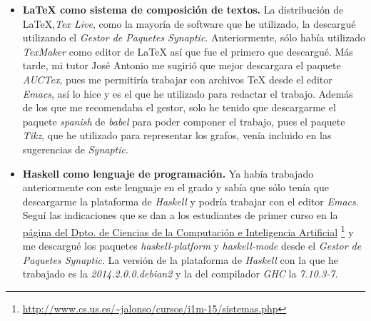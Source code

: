 \begin{itemize}
  \item \textbf{\LaTeX{} como sistema de composición de textos.} La distribución
    de \LaTeX{},\textit{Tex Live}, como la mayoría de software que he utilizado,
    la descargué utilizando el \textit{Gestor de Paquetes Synaptic}.
    Anteriormente, sólo había utilizado  \textit{TexMaker} como editor de 
    \LaTeX{} así que fue el primero que descargué. Más tarde, mi tutor José 
    Antonio me sugirió que mejor descargara el paquete \textit{AUCTex}, pues me
    permitiría trabajar con archivos \TeX{} desde el editor \textit{Emacs}, así
    lo hice y es el que he utilizado para redactar el trabajo. Además de los que
    me recomendaba el gestor, solo he tenido que descargarme el paquete 
    \textit{spanish} de \textit{babel} para poder componer el trabajo, pues
    el paquete \textit{Tikz}, que he utilizado para representar los grafos,
    venía incluido en las sugerencias de \textit{Synaptic}.

  \item \textbf{Haskell como lenguaje de programación.} Ya había trabajado 
    anteriormente con este lenguaje en el grado y sabía que sólo tenía que 
    descargarme la plataforma de \textit{Haskell} y podría trabajar con el 
    editor \textit{Emacs}. Seguí las indicaciones que se dan a los estudiantes
    de primer curso en la 
    \href{http://www.cs.us.es/~jalonso/cursos/i1m-15/sistemas.php}
    {página del Dpto. de Ciencias de la Computación e Inteligencia Artificial}
    \footnote{\url{http://www.cs.us.es/~jalonso/cursos/i1m-15/sistemas.php}}
    y me descargué los paquetes \textit{haskell-platform} y 
    \textit{haskell-mode} desde el \textit{Gestor de Paquetes Synaptic}. La 
    versión de la plataforma de \textit{Haskell} con la que he trabajado
    es la \textit{2014.2.0.0.debian2} y la del compilador \textit{GHC} la
    \textit{7.10.3-7}.



\end{itemize}
